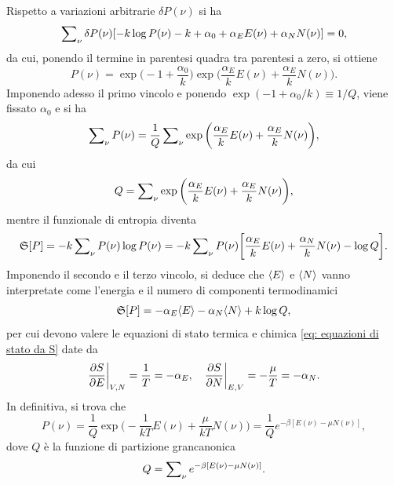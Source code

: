 Rispetto a variazioni arbitrarie $\delta P(\nu)$ si ha
\begin{equation}
    \sum\nolimits_\nu\delta P(\nu)[-k\log{P(\nu)} - k + \alpha_0 + \alpha_EE(\nu) + \alpha_NN(\nu)] = 0,
\end{equation}
da cui, ponendo il termine in parentesi quadra tra parentesi a zero, si ottiene
\begin{equation}
    P(\nu) = \exp{\bigg(-1 + \frac{\alpha_0}{k}\bigg)}\exp{\bigg(\frac{\alpha_E}{k}E(\nu) + \frac{\alpha_E}{k}N(\nu)\bigg)}.
\end{equation}
Imponendo adesso il primo vincolo e ponendo $\exp{(-1 + \alpha_0/k)} \equiv 1/Q$, viene fissato $\alpha_0$ e si ha
\begin{equation}
    \sum\nolimits_\nu P(\nu) = \frac{1}{Q}\sum\nolimits_\nu \exp{\bigg(\frac{\alpha_E}{k}E(\nu) + \frac{\alpha_E}{k}N(\nu)\bigg)},
\end{equation}
da cui 
\begin{equation}
    Q = \sum\nolimits_\nu \exp{\bigg(\frac{\alpha_E}{k}E(\nu) + \frac{\alpha_E}{k}N(\nu)\bigg)},
\end{equation}
mentre il funzionale di entropia diventa
\begin{equation}
    \mathfrak{S}[P] = -k\sum\nolimits_\nu P(\nu) \log{P(\nu)} = -k \sum\nolimits_\nu P(\nu)\bigg[\frac{\alpha_E}{k}E(\nu) + \frac{\alpha_N}{k}N(\nu) - \log{Q}\bigg].
\end{equation}
Imponendo il secondo e il terzo vincolo, si deduce che $\langle E \rangle$ e $\langle N \rangle$ vanno interpretate come l'energia e il numero di componenti termodinamici 
\begin{equation}
\label{eq: entropia di Gibbs (grancanonico)}
    \mathfrak{S}[P] = -\alpha_E\langle E \rangle - \alpha_N\langle N \rangle + k\log{Q},
\end{equation}
per cui devono valere le equazioni di stato termica e chimica \eqref{eq: equazioni di stato da S} date da
\begin{equation}
\label{eq: equazioni di stato grancanonico}
    \frac{\partial S}{\partial E}\bigg|_{V,N} = \frac{1}{T} = -\alpha_E,\quad \frac{\partial S}{\partial N}\bigg|_{E,V} = -\frac{\mu}{T} = -\alpha_N.
\end{equation}
In definitiva, si trova che 
\begin{equation}
    P(\nu) = \frac{1}{Q}\exp{\bigg(-\frac{1}{kT}E(\nu) + \frac{\mu}{kT}N(\nu)\bigg)} = \frac{1}{Q}e^{-\beta[E(\nu) - \mu N(\nu)]},
\end{equation}
dove $Q$ è la funzione di partizione grancanonica
\begin{equation}
\label{eq: funzione di partizione grancanonica}
    Q = \sum\nolimits_\nu e^{-\beta[E(\nu) - \mu N(\nu)]}.
\end{equation}

